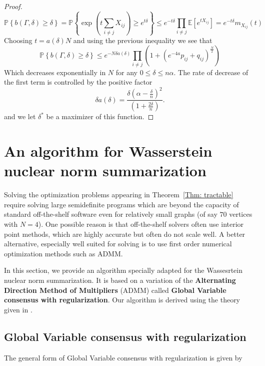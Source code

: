 \documentclass[12pt]{amsart}
\theoremstyle{remark}
\newcommand{\PP}{\mathbb{P}}
\newcommand{\EE}{\mathbb{E}}
\begin{document}
\begin{proof}
\[\PP\left\{b(\Gamma,\delta)\geq \delta\right\}=\PP\left\{\exp\left(t\sum_{i\neq j} X_{ij}\right)\geq e^{t\delta}\right\}\leq e^{-t\delta}\prod_{i\neq j} \EE[e^{tX_{ij}}]= e^{-t\delta}m_{X_{ij}}(t)\]
Choosing $t=a(\delta)N$ and using the previous inequality we see that
\[\PP\left\{b(\Gamma,\delta)\geq \delta\right\}\leq e^{-N\delta a(\delta)}\prod_{i\neq j}\left(1+ (e^{-4a}p_{ij}+q_{ij})^{\frac{N}{2}}\right)\]
Which decreases exponentially in $N$ for any $0\leq \delta\leq n\alpha$. The rate of decrease of the first term is controlled by the positive factor 
\[\delta a(\delta)= \frac{\delta\left(\alpha-\frac{\delta}{n}\right)^2}{\left(1+\frac{2\delta}{n}\right)}.\]
and we let $\delta^*$ be a maximizer of this function.
\end{proof}











\section{An algorithm for Wasserstein nuclear norm summarization }


Solving the optimization problems appearing in Theorem~\ref{Thm: tractable} require solving large semidefinite programs which are beyond the  capacity of standard off-the-shelf software even for relatively small graphs (of say $70$ vertices with $N=4$). One possible reason is that off-the-shelf solvers often use interior point methods, which are highly accurate but often do not scale well. A better alternative, especially well suited for solving is to use first order numerical optimization methods such as ADMM.

In this section, we provide an algorithm specially adapted for the Wassesrtein nuclear norm summarization. It is based on a variation of the \textbf{Alternating Direction Method of Multipliers} (ADMM) called \textbf{Global Variable consensus with regularization}. Our algorithm is derived using the theory given in \cite{boyd2011distributed}.


\subsection{Global Variable consensus with regularization}


The general form of Global Variable consensus with regularization is given by 
\end{document}
